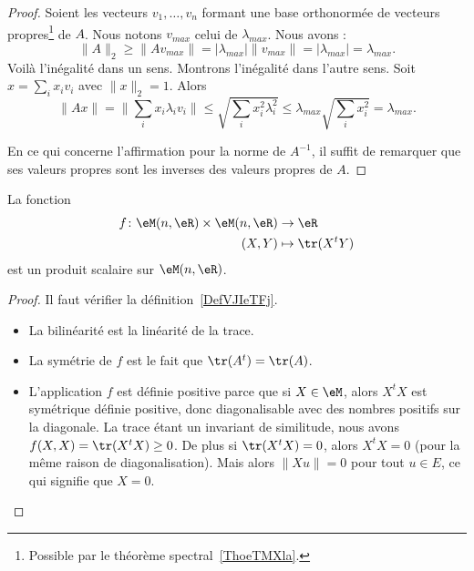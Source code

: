 \begin{proof}
    Soient les vecteurs \( v_1,\ldots, v_n\) formant une base orthonormée de vecteurs propres\footnote{Possible par le théorème spectral~\ref{ThoeTMXla}.} de \( A\). Nous notons \( v_{max}\) celui de \( \lambda_{max}\). Nous avons :
    \begin{equation}
        \| A \|_2\geq \| Av_{max} \|=| \lambda_{max} |\| v_{max} \|=| \lambda_{max} |=\lambda_{max}.
    \end{equation}
    Voilà l'inégalité dans un sens. Montrons l'inégalité dans l'autre sens. Soit \( x=\sum_ix_iv_i\) avec \( \| x \|_2=1\). Alors
    \begin{equation}
        \| Ax \|=\| \sum_ix_i\lambda_iv_i \|\leq\sqrt{ \sum_ix_i^2\lambda_i^2 }\leq \lambda_{max}\sqrt{ \sum_ix_i^2}=\lambda_{max}.
    \end{equation}

    En ce qui concerne l'affirmation pour la norme de \( A^{-1}\), il suffit de remarquer que ses valeurs propres sont les inverses des valeurs propres de \( A\).
\end{proof}

\begin{proposition} \label{PropMAQoKAg}
    La fonction
    \begin{equation}
        \begin{aligned}
            f\colon \eM(n,\eR)\times \eM(n,\eR)&\to \eR \\
            (X,Y)&\mapsto \tr(X^tY)
        \end{aligned}
    \end{equation}
    est un produit scalaire sur \( \eM(n,\eR)\).
\end{proposition}

\begin{proof}
    Il faut vérifier la définition~\ref{DefVJIeTFj}.
    \begin{itemize}
        \item La bilinéarité est la linéarité de la trace.
        \item La symétrie de \( f\) est le fait que \( \tr(A^t)=\tr(A)\).
        \item L'application \( f\) est définie positive parce que si \( X\in \eM\), alors \( X^tX\) est symétrique définie positive, donc diagonalisable avec des nombres positifs sur la diagonale. La trace étant un invariant de similitude, nous avons \( f(X,X)=\tr(X^tX)\geq 0\). De plus si \( \tr(X^tX)=0\), alors \( X^tX=0\) (pour la même raison de diagonalisation). Mais alors \( \| Xu \|=0\) pour tout \( u\in E\), ce qui signifie que \( X=0\).
    \end{itemize}
\end{proof}

